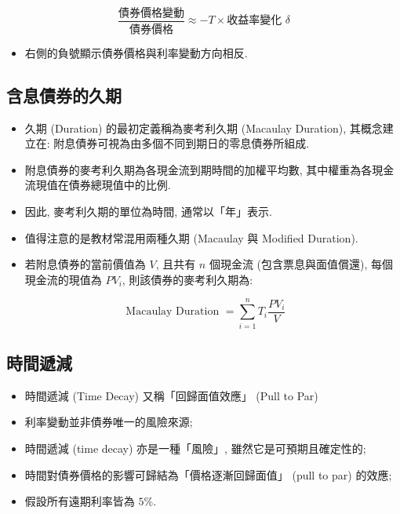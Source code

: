\documentclass[letterpaper]{article}
\begin{document}
		$$
		\frac{\text{債券價格變動}}{\text{債券價格}} \approx -T \times \text{收益率變化 } \delta
		$$
		
		\begin{itemize}
			\item 右側的負號顯示債券價格與利率變動方向相反.  
		\end{itemize}
		
		
		\subsection{含息債券的久期}
		\begin{itemize}
			\item 久期 (Duration) 的最初定義稱為麥考利久期 (Macaulay Duration), 其概念建立在: 附息債券可視為由多個不同到期日的零息債券所組成.  
			\item 附息債券的麥考利久期為各現金流到期時間的加權平均數, 其中權重為各現金流現值在債券總現值中的比例.  
			\item 因此, 麥考利久期的單位為時間, 通常以「年」表示.  
			\item 值得注意的是教材常混用兩種久期 (Macaulay 與 Modified Duration).  
			\item 若附息債券的當前價值為 $V$, 且共有 $n$ 個現金流 (包含票息與面值償還), 每個現金流的現值為 $PV_{i}$, 則該債券的麥考利久期為: 
		\end{itemize}
		
		
		$$
		\text { Macaulay Duration }=\sum_{i=1}^{n} T_{i} \frac{P V_{i}}{V}
		$$
		
		\subsection{時間遞減}
		\begin{itemize}
			\item 時間遞減 (Time Decay) 又稱「回歸面值效應」 (Pull to Par) 
			\item 利率變動並非債券唯一的風險來源; 
			\item 時間遞減 (time decay) 亦是一種「風險」, 雖然它是可預期且確定性的; 
			\item 時間對債券價格的影響可歸結為「價格逐漸回歸面值」 (pull to par) 的效應; 
			\item 假設所有遠期利率皆為 $5\%$.  
		\end{itemize}
		
\end{document}
